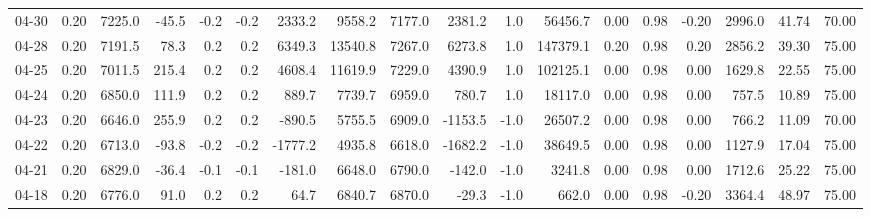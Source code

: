 \begin{threeparttable}
{\begin{tabular}{lrrrrrrrrrrrrrrrrr}
  04-30 &     0.20 & 7225.0 &             -45.5 &              -0.2 &               -0.2 &             2333.2 &  9558.2 & 7177.0 &     2381.2 &                      1.0 &             56456.7 &       0.00 &      0.98 &          -0.20 &           2996.0 &           41.74 &                  70.00 \\
  04-28 &     0.20 & 7191.5 &              78.3 &               0.2 &                0.2 &             6349.3 & 13540.8 & 7267.0 &     6273.8 &                      1.0 &            147379.1 &       0.20 &      0.98 &           0.20 &           2856.2 &           39.30 &                  75.00 \\
  04-25 &     0.20 & 7011.5 &             215.4 &               0.2 &                0.2 &             4608.4 & 11619.9 & 7229.0 &     4390.9 &                      1.0 &            102125.1 &       0.00 &      0.98 &           0.00 &           1629.8 &           22.55 &                  75.00 \\
  04-24 &     0.20 & 6850.0 &             111.9 &               0.2 &                0.2 &              889.7 &  7739.7 & 6959.0 &      780.7 &                      1.0 &             18117.0 &       0.00 &      0.98 &           0.00 &            757.5 &           10.89 &                  75.00 \\
  04-23 &     0.20 & 6646.0 &             255.9 &               0.2 &                0.2 &             -890.5 &  5755.5 & 6909.0 &    -1153.5 &                     -1.0 &             26507.2 &       0.00 &      0.98 &           0.00 &            766.2 &           11.09 &                  70.00 \\
  04-22 &     0.20 & 6713.0 &             -93.8 &              -0.2 &               -0.2 &            -1777.2 &  4935.8 & 6618.0 &    -1682.2 &                     -1.0 &             38649.5 &       0.00 &      0.98 &           0.00 &           1127.9 &           17.04 &                  75.00 \\
  04-21 &     0.20 & 6829.0 &             -36.4 &              -0.1 &               -0.1 &             -181.0 &  6648.0 & 6790.0 &     -142.0 &                     -1.0 &              3241.8 &       0.00 &      0.98 &           0.00 &           1712.6 &           25.22 &                  75.00 \\
  04-18 &     0.20 & 6776.0 &              91.0 &               0.2 &                0.2 &               64.7 &  6840.7 & 6870.0 &      -29.3 &                     -1.0 &               662.0 &       0.00 &      0.98 &          -0.20 &           3364.4 &           48.97 &                  75.00 \\

\end{tabular}}
\end{threeparttable}
